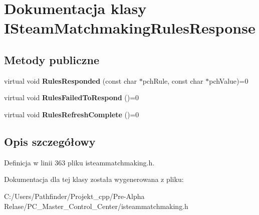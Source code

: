\hypertarget{class_i_steam_matchmaking_rules_response}{}\section{Dokumentacja klasy I\+Steam\+Matchmaking\+Rules\+Response}
\label{class_i_steam_matchmaking_rules_response}
\subsection*{Metody publiczne}
\begin{DoxyCompactItemize}
\item 
\mbox{\label{class_i_steam_matchmaking_rules_response_a0d9557ebe60d3633a4753e9548b0f4e6}} 
virtual void {\bfseries Rules\+Responded} (const char $\ast$pch\+Rule, const char $\ast$pch\+Value)=0
\item 
\mbox{\label{class_i_steam_matchmaking_rules_response_a17bd5325098ea4ee47a87c30441d0a03}} 
virtual void {\bfseries Rules\+Failed\+To\+Respond} ()=0
\item 
\mbox{\label{class_i_steam_matchmaking_rules_response_a139e44013499588321c04a907d33dc9b}} 
virtual void {\bfseries Rules\+Refresh\+Complete} ()=0
\end{DoxyCompactItemize}


\subsection{Opis szczegółowy}


Definicja w linii 363 pliku isteammatchmaking.\+h.



Dokumentacja dla tej klasy została wygenerowana z pliku\+:\begin{DoxyCompactItemize}
\item 
C\+:/\+Users/\+Pathfinder/\+Projekt\+\_\+cpp/\+Pre-\/\+Alpha Relase/\+P\+C\+\_\+\+Master\+\_\+\+Control\+\_\+\+Center/isteammatchmaking.\+h\end{DoxyCompactItemize}
